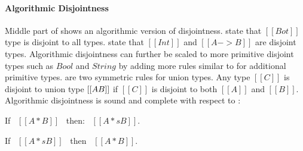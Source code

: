 \begin{comment}
\begin{figure}[t]
  \begin{small}
    \centering
    \drules[ad]{$[[A * B]]$}{Algorithmic Disjointness}{btmr, btml, intl, intr, orl, orr}
  \end{small}
  \caption{Algorithmic Disjointness for \cal.}
  \label{fig:union:ad}
\end{figure}
\end{comment}

\paragraph{Algorithmic Disjointness}
Middle part of  shows an algorithmic version of disjointness.
 state that $[[Bot]]$ type is disjoint to all types.
 state that $[[Int]]$ and $[[A -> B]]$ are disjoint types.
Algorithmic disjointness can further be scaled to more primitive disjoint types such as
$Bool$ and $String$ by adding more rules similar to  for additional primitive types.
 are two symmetric rules for union types. Any type $[[C]]$ is disjoint
to union type $[[A \/ B]]$ if $[[C]]$ is disjoint to both $[[A]]$ and $[[B]]$.
Algorithmic disjointness is sound and complete with respect to :

\begin{lemma}
  If \ $[[A * B]]$ \ then: \ $[[A *s B]]$.
\label{lemma:union:disj-sound}
\end{lemma}

\begin{comment}
\begin{proof}
  By induction on algorithmic disjointness relation.
  \begin{itemize}
    \item Cases \rref{ad-btmr, ad-btml, ad-orl, ad-orr} require induction on hypothesis
          and \Cref{lemma:union:sub-or}.
    \item Cases \rref{ad-intl, ad-intr} require induction on type and \Cref{lemma:union:sub-or}.
  \end{itemize}
\end{proof}
\end{comment}

\begin{lemma}
  If \ $[[A *s B]]$ \ then \ $[[A * B]]$.
\label{lemma:union:disj-complete}
\end{lemma}

